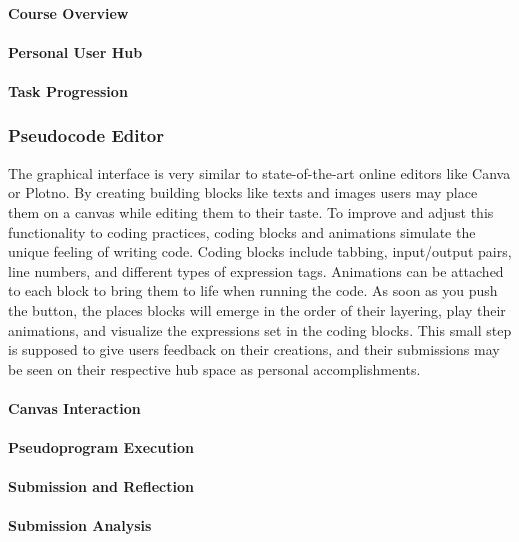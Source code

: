\paragraph{Course Overview}
\paragraph{Personal User Hub}
\paragraph{Task Progression}
\subsubsection{Pseudocode Editor}
The graphical interface is very similar to state-of-the-art online editors like Canva or Plotno. By creating building blocks like texts and images users may place them on a canvas while editing them to their taste. To improve and adjust this functionality to coding practices, coding blocks and animations simulate the unique feeling of writing code. Coding blocks include tabbing, input/output pairs, line numbers, and different types of expression tags. Animations can be attached to each block to bring them to life when running the code. As soon as you push the button, the places blocks will emerge in the order of their layering, play their animations, and visualize the expressions set in the coding blocks. This small step is supposed to give users feedback on their creations, and their submissions may be seen on their respective hub space as personal accomplishments. 
\paragraph{Canvas Interaction}
\paragraph{Pseudoprogram Execution}
\paragraph{Submission and Reflection}
\paragraph{Submission Analysis}
